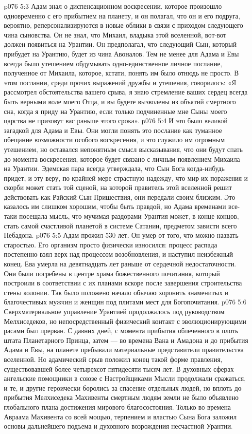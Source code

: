 \vs p076 5:3 \pc Адам знал о диспенсационном воскресении, которое произошло одновременно с его прибытием на планету, и он полагал, что он и его подруга, вероятно, реперсонализируются в новые облики в связи с приходом следующего чина сыновства. Он не знал, что Михаил, владыка этой вселенной, вот\hyp{}вот должен появиться на Урантии. Он предполагал, что следующий Сын, который прибудет на Урантию, будет из чина Авоналов. Тем не менее для Адама и Евы всегда было утешением обдумывать одно\hyp{}единственное личное послание, полученное от Михаила, которое, кстати, понять им было отнюдь не просто. В этом послании, среди прочих выражений дружбы и утешения, говорилось: «Я рассмотрел обстоятельства вашего срыва, я знаю стремление ваших сердец всегда быть верными воле моего Отца, и вы будете вызволены из объятий смертного сна, когда я приду на Урантию, если только подчиненные мне Сыны моего царства не призовут вас раньше этого срока».
\vs p076 5:4 И это было великой загадкой для Адама и Евы. Они могли понять это послание как туманное обещание возможности особого воскресения, и это служило им огромным утешением, но оставался непонятным смысл высказывания, что они будут спать до момента воскресения, которое будет связано с личным появлением Михаила на Урантии. Эдемская пара всегда утверждала, что Сын Бога когда\hyp{}нибудь придет, и эту веру, по крайней мере страстную надежду, что мир их поражения и скорби может стать той сценой, на которой правитель этой вселенной решит действовать как Райский Сын Пришествия, они передали своим близким. Это казалось им слишком хорошим, чтобы быть правдой, но Адама временами все\hyp{}таки посещала мысль, что мучимая раздорами Урантия может, в конце концов, стать самой счастливой планетой в системе Сатании, предметом зависти всего Небадона.
\vs p076 5:5 \pc Адам прожил 530 лет. Он умер от того, что можно назвать старостью. Его организм просто физически износился: процесс распада постепенно взял верх над процессом возобновления, и наступил неизбежный конец. Ева умерла на девятнадцать лет раньше от сердечной недостаточности. Они были погребены в центре храма божественного почитания, который построили в соответствии с их планами вскоре после завершения строительства стены колонии. Так было положено начало обычаю хоронить знаменитых и благочестивых мужчин и женщин под плитами мест для Богопочитания.
\vs p076 5:6 \pc Сверхматериальное управление Урантией продолжалось под руководством Мелхиседеков, но непосредственный физический контакт с эволюционирующими расами был прерван. С давних дней, с момента прибытия облеченного в плоть штата Планетарного Принца, затем --- во времена Вана и Амадона и до прибытия Адама и Евы, на планете пребывали материальные представители правительства вселенной. Но адамический срыв положил конец такой форме правления, существовавшей более четырехсот пятидесяти тысяч лет. В духовных сферах ангельские помощники в союзе с Настройщиками Мысли продолжали сражаться, и те, и другие героически боролись за спасение отдельных людей, но вплоть до прибытия Мелхиседека Махивенты смертным людям земли не было объявлено глобального плана достижения мирового благосостояния. Только во времена Авраама Махивента со всей мощью, терпением и властью Сына Бога заложил основы дальнейшего подъема и духовного возрождения несчастной Урантии.
